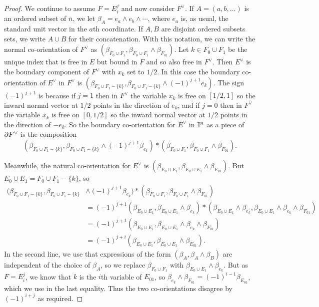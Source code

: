 \begin{proof}
	We continue to assume $F = E_i^j$ and now consider $F^\vee$.
	If $A=(a,b,\ldots)$ is an ordered subset of $\overline{n}$, we let $\beta_A = e_a \wedge e_b \wedge \cdots$, where $e_a$ is, as usual, the standard unit vector in the $a$th coordinate.
	If $A, B$ are disjoint ordered subsets sets, we write $A \cup B$ for their concatenation.
	With this notation, we can write the normal co-orientation of $F^\vee$ as $(\beta_{F_0 \cup F_1},\beta_{F_0 \cup F_1} \wedge \beta_{F_{01}})$.
	Let $k \in F_0 \cup F_1$ be the unique index that is free in $E$ but bound in $F$ and so also free in $F^\vee$.
	Then $E^\vee$ is the boundary component of $F^\vee$ with $x_k$ set to $1/2$.
	In this case the boundary co-orientation of $E^\vee$ in $F^\vee$ is $(\beta_{F_0 \cup F_1 - \{k\}},\beta_{F_0 \cup F_1 - \{k\}} \wedge (-1)^{j+1} e_k)$.
	The sign $(-1)^{j+1}$ is because if $j = 1$ then in $F^\vee$ the variable $x_k$ is free on $[1/2,1]$ so the inward normal vector at $1/2$ points in the direction of $e_k$, and if $j = 0$ then in $F^\vee$ the variable $x_k$ is free on $[0,1/2]$ so the inward normal vector at $1/2$ points in the direction of $-e_k$.
	So the boundary co-orientation for $E^\vee$ in $\mathbb{I}^n$ as a piece of $\partial F^\vee$ is the composition $$(\beta_{F_0 \cup F_1 - \{k\}},\beta_{F_0 \cup F_1 - \{k\}} \wedge (-1)^{j+1} \beta_{e_k})*(\beta_{F_0 \cup F_1},\beta_{F_0 \cup F_1} \wedge \beta_{F_{01}}).$$

	Meanwhile, the natural co-orientation for $E^\vee$ is $(\beta_{E_0 \cup E_1},\beta_{E_0 \cup E_1} \wedge \beta_{E_{01}}).$
	But $E_0 \cup E_1 = F_0 \cup F_1 - \{k\}$, so
	\begin{align*}
		(\beta_{F_0 \cup F_1 - \{k\}},\beta_{F_0 \cup F_1 - \{k\}}& \wedge (-1)^{j+1} \beta_{e_k})*(\beta_{F_0 \cup F_1},\beta_{F_0 \cup F_1} \wedge \beta_{F_{01}})\\
		& = (-1)^{j+1}(\beta_{E_0 \cup E_1},\beta_{E_0 \cup E_1} \wedge \beta_{e_k})*(\beta_{E_0 \cup E_1} \wedge \beta_{e_k},\beta_{E_0 \cup E_1} \wedge \beta_{e_k} \wedge \beta_{F_{01}})\\
		& = (-1)^{j+1}(\beta_{E_0 \cup E_1},\beta_{E_0 \cup E_1} \wedge \beta_{e_k} \wedge \beta_{F_{01}})\\
		& = (-1)^{j+i}(\beta_{E_0 \cup E_1},\beta_{E_0 \cup E_1} \wedge \beta_{E_{01}}).
	\end{align*}
	In the second line, we use that expressions of the form $(\beta_A, \beta_A \wedge \beta_B)$ are independent of the choice of $\beta_A$, so we replace $\beta_{F_0 \cup F_1}$ with $\beta_{E_0 \cup E_1} \wedge \beta_{e_k}$.
	But as $F = E_i^j$, we know that $k$ is the $i$th variable of $E_{01}$, so
	$\beta_{e_k} \wedge \beta_{F_{01}} = (-1)^{i-1}\beta_{E_{01}}$, which we use in the last equality.
	Thus the two co-orientations disagree by $(-1)^{i+j}$ as required.
\end{proof}


